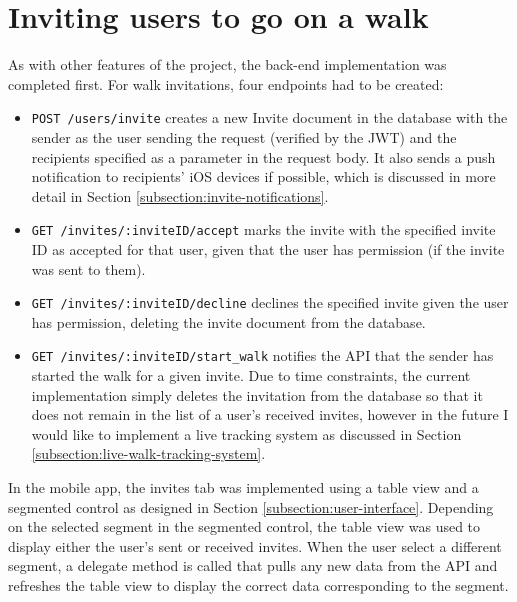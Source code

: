 \section{Inviting users to go on a walk}


As with other features of the project, the back-end implementation was completed first. For walk invitations, four endpoints had to be created:

\begin{itemize}
  \item \verb|POST /users/invite| creates a new Invite document in the database with the sender as the user sending the request (verified by the JWT) and the recipients specified as a parameter in the request body. It also sends a push notification to recipients' iOS devices if possible, which is discussed in more detail in Section \ref{subsection:invite-notifications}.

  \item \verb|GET /invites/:inviteID/accept| marks the invite with the specified invite ID as accepted for that user, given that the user has permission (if the invite was sent to them).

  \item \verb|GET /invites/:inviteID/decline| declines the specified invite given the user has permission, deleting the invite document from the database.

  \item \verb|GET /invites/:inviteID/start_walk| notifies the API that the sender has started the walk for a given invite. Due to time constraints, the current implementation simply deletes the invitation from the database so that it does not remain in the list of a user's received invites, however in the future I would like to implement a live tracking system as discussed in Section \ref{subsection:live-walk-tracking-system}.
\end{itemize}

In the mobile app, the invites tab was implemented using a table view and a segmented control as designed in Section \ref{subsection:user-interface}. Depending on the selected segment in the segmented control, the table view was used to display either the user's sent or received invites. When the user select a different segment, a delegate method is called that pulls any new data from the API and refreshes the table view to display the correct data corresponding to the segment.


